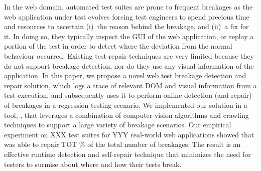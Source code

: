In the web domain, automated test suites are prone to frequent breakages as the web application under test evolves forcing test engineers to spend precious time and resources to ascertain (i)~the reason behind the breakage, and (ii)~a fix for it. In doing so, they typically inspect the GUI of the web application, or replay a portion of the test in order to detect where the deviation from the normal behaviour occurred. 
Existing test repair techniques are very limited because they do not support breakage detection, nor do they use any visual information of the application.
In this paper, we propose a novel web test breakage detection and repair solution, which logs a trace of relevant DOM and visual information from a test execution, and subsequently uses it to perform online detection (and repair) of breakages in a regression testing scenario. We implemented our solution in a tool, \tool, that leverages a combination of computer vision algorithms and crawling  techniques to support a large variety of breakage scenarios. Our empirical experiment on XXX test suites for YYY real-world web applications showed that \tool was able to repair TOT \% of the total number of breakages. The result is an effective runtime detection and self-repair technique that minimizes the need for testers to surmise about where and how their tests break.